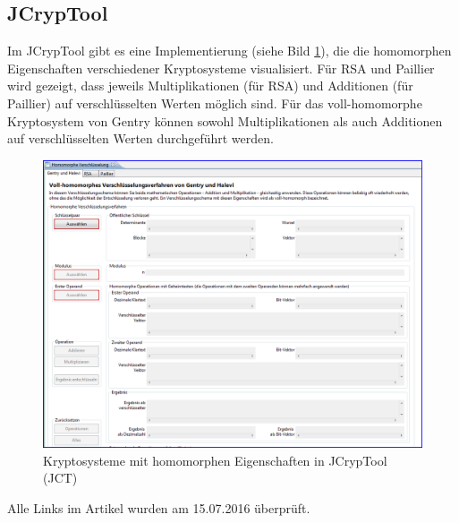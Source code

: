 \begin{refsegment}
\subsection{JCrypTool}

Im JCrypTool gibt es eine Implementierung (siehe Bild \ref{JCT-HomEnc}), die die homomorphen Eigenschaften verschiedener Kryptosysteme visualisiert. Für RSA und Paillier wird gezeigt, dass jeweils Multiplikationen (für RSA) und Additionen (für Paillier) auf verschlüsselten Werten möglich sind. Für das voll-homomorphe Kryptosystem von Gentry können sowohl Multiplikationen als auch Additionen auf verschlüsselten Werten durchgeführt werden.

\begin{figure}[ht]
\begin{center}
\includegraphics[scale=0.4]{figures/JCT-HomEnc.PNG}
\caption{Kryptosysteme mit homomorphen Eigenschaften in JCrypTool (JCT)}
\label{JCT-HomEnc}
\end{center}
\end{figure}



\printbibliography[%
	heading=subbibintoc,
	title={Literatur zu Kapitel \thechapter},
	segment=\therefsegment,
]


Alle Links im Artikel wurden am 15.07.2016 überprüft.


\end{refsegment}

